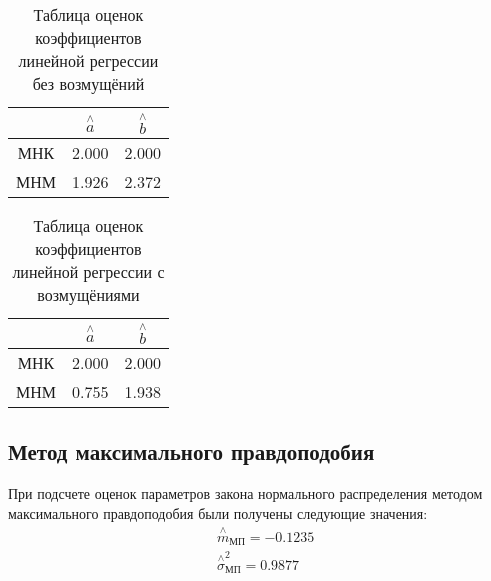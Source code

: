 \documentclass[a4]{article}
\begin{document}
\begin{table}[H]
\caption{Таблица оценок коэффициентов линейной регрессии без возмущёний}
\label{tab:my_label1}
\begin{center}
\vspace{5mm}
\begin{tabular}{|c|c|c|}
\hline
& $\overset{\wedge}{a}$ & $\overset{\wedge}{b}$\\
\hline
МНК &2.000&2.000\\
\hline
МНМ &1.926&2.372\\
\hline
\end{tabular}
\end{center}
\end{table}


\begin{table}[H]
\caption{Таблица оценок коэффициентов линейной регрессии с возмущёниями}
\label{tab:my_label2}
\begin{center}
\vspace{5mm}
\begin{tabular}{|c|c|c|}
\hline
& $\overset{\wedge}{a}$ & $\overset{\wedge}{b}$\\
\hline
МНК &2.000&2.000\\
\hline
МНМ &0.755 &1.938\\
\hline
\end{tabular}
\end{center}
\end{table}
\subsection{Метод максимального правдоподобия}

При подсчете оценок параметров закона нормального распределения методом максимального правдоподобия были получены следующие значения:
\begin{equation}
\begin{split}
    &\overset{\wedge}{m}_{\text{МП}} = -0.1235\\
   &  \overset{\wedge}{\sigma}^2_{\text{МП}} = 0.9877
\end{split}
\end{equation}
\end{document}
